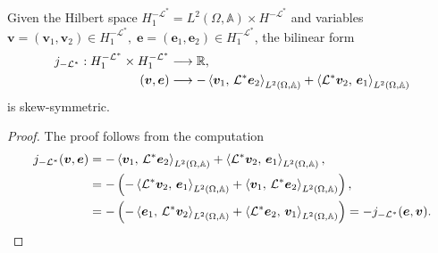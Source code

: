 \begin{proposition}
	Given the Hilbert space $H^{-\mathcal{L}^*}_1 = L^2(\Omega, \mathbb{A}) \times H^{-\mathcal{L}^*}$ and variables $\bm{v} = (\bm{v}_1, \bm{v}_2) \in H^{-\mathcal{L}^*}_1, \; \bm{e} = (\bm{e}_1, \bm{e}_2) \in H^{-\mathcal{L}^*}_1$, the bilinear form 
	\begin{equation*}
	\begin{aligned}
	j_{-\mathcal{L}^*}: H^{-\mathcal{L}^*}_1 \times H^{-\mathcal{L}^*}_1 &\longrightarrow \mathbb{R}, \\
	(\bm{v}, \bm{e}) &\longrightarrow -\inner[L^2(\Omega, \mathbb{A})]{\bm{v}_1}{\mathcal{L}^*\bm{e}_2} + \inner[L^2(\Omega, \mathbb{A})]{\mathcal{L}^*\bm{v}_2}{\bm{e}_1}
	\end{aligned}
	\end{equation*}
	is skew-symmetric.
	\begin{proof}
		The proof follows from the computation
		\begin{equation*}
		\begin{aligned}
		j_{-\mathcal{L}^*}(\bm{v}, \bm{e}) &= -\inner[L^2(\Omega, \mathbb{A})]{\bm{v}_1}{\mathcal{L}^*\bm{e}_2} + \inner[L^2(\Omega, \mathbb{A})]{\mathcal{L}^*\bm{v}_2}{\bm{e}_1}, \\
		&= - \left(-\inner[L^2(\Omega, \mathbb{A})]{\mathcal{L}^*\bm{v}_2}{\bm{e}_1} + \inner[L^2(\Omega, \mathbb{A})]{\bm{v}_1}{\mathcal{L}^*\bm{e}_2}\right), \\
		&= - \left(-\inner[L^2(\Omega, \mathbb{A})]{\bm{e}_1}{\mathcal{L}^*\bm{v}_2} + \inner[L^2(\Omega, \mathbb{A})]{\mathcal{L}^*\bm{e}_2}{\bm{v}_1}\right) = - j_{-\mathcal{L}^*}(\bm{e}, \bm{v}).
		\end{aligned}
		\end{equation*}
	\end{proof}
\end{proposition}

